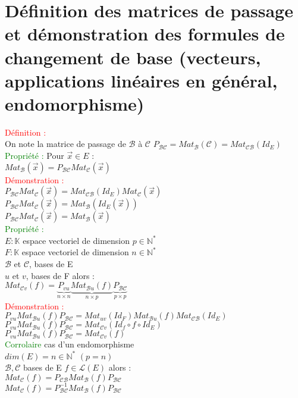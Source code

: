 \documentclass{article}
\begin{document}
        \section{Définition des matrices de passage et démonstration des formules de changement de base (vecteurs, applications linéaires en général, endomorphisme)}
				\textcolor{red}{Définition :} \\
				On  note la matrice de passage de $\mathcal B$ à $\mathcal C$ $P_{\mathcal{BC}}= Mat_{\mathcal B}(\mathcal C)= Mat_{\mathcal{CB}}(Id_E)$ \\
				\textcolor{green}{Propriété :} Pour $\vec x \in E$ : \\
				$Mat_{\mathcal B}(\vec x)=P_{\mathcal{BC}} Mat_{\mathcal C}(\vec x)$ \\
				\textcolor{red}{Démonstration :}  \\
				$P_{\mathcal{BC}}Mat_{\mathcal C}(\vec x)= Mat_{\mathcal{CB}}(Id_E) Mat_{\mathcal C}(\vec x)$ \\
				$P_{\mathcal{BC}}Mat_{\mathcal C}(\vec x)= Mat_{\mathcal B}(Id_E(\vec x))$ \\
				$P_{\mathcal{BC}}Mat_{\mathcal C}(\vec x)= Mat_{\mathcal B}(\vec x)$ \\
				\textcolor{green}{Propriété :} \\
				$E: \mathbb K$ espace vectoriel de dimension $p \in \mathbb N^*$ \\
				$F: \mathbb K$ espace vectoriel de dimension $n \in \mathbb N^*$ \\
				$\mathcal B$ et $\mathcal C$, bases de  E \\
				$ u$ et $ v$, bases de F alors : \\
				$Mat_{\mathcal C  v}(f)= \underbrace{P_{vu}}_{n \times n} \underbrace{Mat_{\mathcal B u}(f)}_{n \times p}  \underbrace{P_{\mathcal{BC}}}_{p \times p}$ \\
				\textcolor{red}{Démonstration :} \\
				$P_{vu} Mat_{\mathcal B u}(f) P_{\mathcal{BC}}=Mat_{uv}(Id_F) Mat_{\mathcal{B} u}(f) Mat_{\mathcal{CB}}(Id_E)$ \\
				$P_{vu} Mat_{\mathcal B u}(f) P_{\mathcal{BC}} = Mat_{\mathcal C  v}(Id_f \circ f \circ Id_E)$ \\
				$P_{vu} Mat_{\mathcal B u} (f) P_{\mathcal{BC}} = Mat_{\mathcal C  v}(f)$ \\
				\textcolor{green}{Corrolaire} cas d'un endomorphisme \\
				$dim(E)=n \in \mathbb N^*$ $(p=n)$ \\
				$\mathcal {B,C}$ bases de E $f \in \mathcal L (E)$  alors : \\
				$Mat_{\mathcal C}(f)=P_{\mathcal{CB}} Mat_{\mathcal{B}}(f) P_{\mathcal{BC}}$ \\
				$Mat_{\mathcal C}(f)=P^{-1}_{\mathcal{BC}} Mat_{\mathcal{B}}(f)P_{\mathcal{BC}}$
\end{document}
